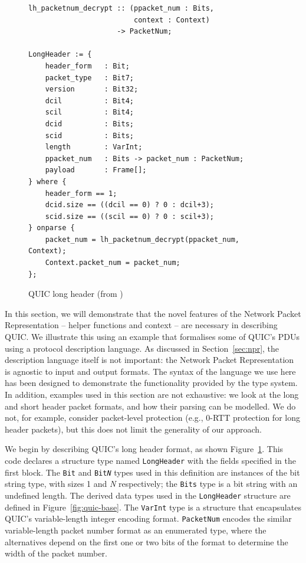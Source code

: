 \documentclass[10pt,sigconf]{acmart}
\begin{document}
\begin{figure}
	\vspace{3mm}
    \begin{BVerbatim}[fontsize=\scriptsize]
lh_packetnum_decrypt :: (ppacket_num : Bits, 
                         context : Context) 
                     -> PacketNum;

LongHeader := {
	header_form   : Bit;
	packet_type   : Bit7;
	version       : Bit32;
	dcil          : Bit4;
	scil          : Bit4;
	dcid          : Bits;
	scid          : Bits;
	length        : VarInt;
	ppacket_num   : Bits -> packet_num : PacketNum;
	payload       : Frame[];
} where {
	header_form == 1;
	dcid.size == ((dcil == 0) ? 0 : dcil+3);
	scid.size == ((scil == 0) ? 0 : scil+3);
} onparse {
	packet_num = lh_packetnum_decrypt(ppacket_num, Context);
	Context.packet_num = packet_num;
};
    \end{BVerbatim}
    \caption{QUIC long header (from \cite{draft-ietf-quic-transport-latest})}
    \label{fig:quic-long-hdr-desc}
\end{figure}

In this section, we will demonstrate that the novel features of the Network Packet Representation
 -- helper functions and context -- are necessary in describing QUIC. We illustrate
this using an example that formalises some of QUIC's PDUs using a protocol description
language. As discussed in Section~\ref{sec:npr}, the description language itself is not important: the
Network Packet Representation is agnostic to input and output formats. The syntax of the
language we use here has been designed to demonstrate the functionality provided by the
type system. In addition, examples used in this section are not exhaustive:
we look at the long and short header packet formats, and how their parsing
can be modelled. We do not, for example, consider packet-level protection (e.g., 0-RTT protection for
long header packets), but this does not limit the generality of our approach.

We begin by describing QUIC's long header
format, as shown Figure~\ref{fig:quic-long-hdr-desc}. This code declares a structure type
named \texttt{LongHeader} with the fields specified in the first block. The \texttt{Bit}
and \texttt{Bit\emph{N}} types used in this definition are instances
of the bit string type, with sizes 1 and \emph{N} respectively; the \texttt{Bits} type is a bit 
string with an undefined length. The derived data types 
used in the \texttt{LongHeader} structure are defined in Figure~\ref{fig:quic-base}. The
\texttt{VarInt} type is a structure that encapsulates QUIC's variable-length integer
encoding format. \texttt{PacketNum} encodes the similar variable-length packet number
format as an enumerated type, where the alternatives depend on the first one or two bits of the
format to determine the width of the packet number.
\end{document}
